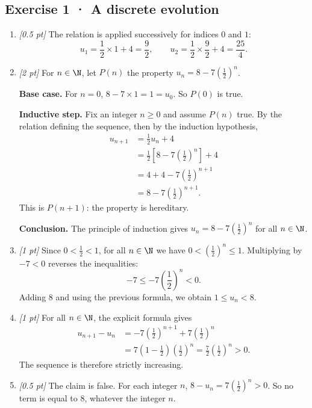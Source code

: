 \subsection*{Exercise 1 · A discrete evolution}\begin{enumerate}

\item \textit{[0.5 pt]} The relation is applied successively for indices $0$ and $1$:\[u_1=\frac{1}{2}\times 1+4=\frac{9}{2},\qquad u_2=\frac{1}{2}\times \frac{9}{2}+4=\frac{25}{4}.\]

\item \textit{[2 pt]} For $n\in\N$, let $P(n)$ the property $u_n=8-7\left(\frac{1}{2}\right)^n$.
\par\smallskip\textbf{Base case.} For $n=0$, $8-7\times1=1=u_0$. So $P(0)$ is true.
\par\smallskip\textbf{Inductive step.} Fix an integer $n\ge0$ and assume $P(n)$ true. By the relation defining the sequence, then by the induction hypothesis,
\[\begin{aligned}u_{n+1}&=\frac{1}{2}u_n+4\\
&=\frac{1}{2}\left[8-7\left(\frac{1}{2}\right)^n\right]+4\\
&=4+4-7\left(\frac{1}{2}\right)^{n+1}\\
&=8-7\left(\frac{1}{2}\right)^{n+1}.
\end{aligned}\]
This is $P(n+1)$: the property is hereditary.
\par\smallskip\textbf{Conclusion.} The principle of induction gives $u_n=8-7\left(\frac{1}{2}\right)^n$ for all $n\in\N$.

\item \textit{[1 pt]} Since $0<\frac{1}{2}<1$, for all $n\in\N$ we have $0<(\frac{1}{2})^n\le1$. Multiplying by $-7<0$ reverses the inequalities:
\[-7\le-7(\frac{1}{2})^n<0.\]
Adding $8$ and using the previous formula, we obtain $1\le u_n<8$.

\item \textit{[1 pt]} For all $n\in\N$, the explicit formula gives
\[\begin{aligned}u_{n+1}-u_n&=-7(\frac{1}{2})^{n+1}+7(\frac{1}{2})^n\\&=7(1-\frac{1}{2})(\frac{1}{2})^n=\frac{7}{2}(\frac{1}{2})^n>0.\end{aligned}\]
The sequence is therefore strictly increasing.

\item \textit{[0.5 pt]} The claim is false. For each integer $n$, $8-u_n=7(\frac{1}{2})^n>0$. So no term is equal to $8$, whatever the integer $n$.

\end{enumerate}

